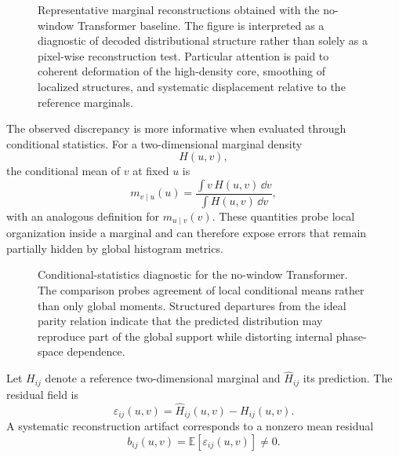 \begin{figure}[H]
\centering
{}
\caption{
Representative marginal reconstructions obtained with the no-window Transformer baseline. The figure is interpreted as a diagnostic of decoded distributional structure rather than solely as a pixel-wise reconstruction test. Particular attention is paid to coherent deformation of the high-density core, smoothing of localized structures, and systematic displacement relative to the reference marginals.
}
\label{fig:tf_nowindow_marginals}
\end{figure}

The observed discrepancy is more informative when evaluated through conditional statistics. For a two-dimensional marginal density
\begin{equation}
H(u,v),
\end{equation}
the conditional mean of \(v\) at fixed \(u\) is
\begin{equation}
m_{v\mid u}(u)
=
\frac{
\int v\,H(u,v)\,\dd v
}{
\int H(u,v)\,\dd v
},
\label{eq:conditional_mean_v_given_u}
\end{equation}
with an analogous definition for \(m_{u\mid v}(v)\). These quantities probe local organization inside a marginal and can therefore expose errors that remain partially hidden by global histogram metrics.

\begin{figure}[H]
\centering
{}
\caption{
Conditional-statistics diagnostic for the no-window Transformer. The comparison probes agreement of local conditional means rather than only global moments. Structured departures from the ideal parity relation indicate that the predicted distribution may reproduce part of the global support while distorting internal phase-space dependence.
}
\label{fig:tf_nowindow_conditional_artifact}
\end{figure}

Let \(H_{ij}\) denote a reference two-dimensional marginal and
\(\widehat{H}_{ij}\) its prediction. The residual field is
\begin{equation}
\varepsilon_{ij}(u,v)
=
\widehat{H}_{ij}(u,v)
-
H_{ij}(u,v).
\label{eq:histogram_residual_field}
\end{equation}
A systematic reconstruction artifact corresponds to a nonzero mean residual
\begin{equation}
b_{ij}(u,v)
=
\mathbb{E}
\left[
\varepsilon_{ij}(u,v)
\right]
\neq 0.
\label{eq:residual_bias_revised}
\end{equation}


